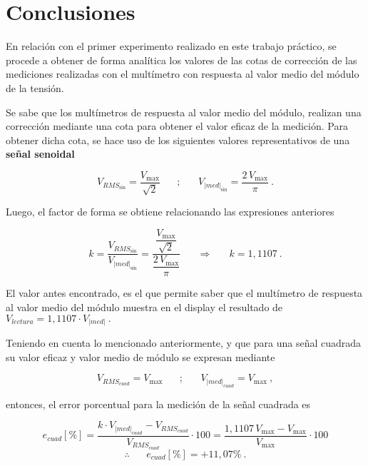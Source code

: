   \pagebreak
  \section{Conclusiones}
    En relación con el primer experimento realizado en este trabajo
    práctico, se procede a obtener de forma analítica los valores
    de las cotas de corrección de las mediciones realizadas con
    el multímetro con respuesta al valor medio del módulo de la 
    tensión.
    
    Se sabe que los multímetros de respuesta al valor medio del
    módulo, realizan una corrección mediante una cota para obtener 
    el valor eficaz de la medición. Para obtener dicha cota, se 
    hace uso de los siguientes valores representativos de una 
    \textbf{señal senoidal}

    \vspace{-5pt}
    $$ V_{RMS_{\sin}} = \dfrac{V_{\max}}{\sqrt{2}} \hspace{20pt} ; 
    \hspace{20pt} V_{|med|_{\sin}} = \dfrac{2\, V_{\max}}{\pi}~. $$

    \noindent Luego, el factor de forma se obtiene
    relacionando las expresiones anteriores
    
    \vspace{-5pt}
     $$ k = \dfrac{V_{RMS_{\sin}}}{V_{|med|_{\sin}}} 
        = \dfrac{\dfrac{V_{\max}}{\sqrt{2}}}{\dfrac{2\, V_{\max}}{\pi}}
        \hspace{20pt} \Longrightarrow \hspace{20pt} k = 1,1107~.$$

    El valor antes encontrado, es el que permite saber que el multímetro
    de respuesta al valor medio del módulo muestra en el display el 
    resultado de $ V_{lectura} = 1,1107 \cdot V_{|med|}~. $

    Teniendo en cuenta lo mencionado anteriormente, y que para una señal cuadrada
    su valor eficaz y valor medio de módulo se expresan mediante

    \vspace{-5pt}
    $$ V_{RMS_{cuad}} = V_{\max} \hspace{20pt} ; \hspace{20pt} V_{|med|_{cuad}} = V_{\max}~, $$

    \noindent entonces, el error porcentual para la medición de 
    la señal cuadrada es

    \vspace{-5pt}
    $$ e_{cuad} [\%] = \dfrac{k \cdot V_{|med|_{cuad}} -  V_{RMS_{cuad}}}{V_{RMS_{cuad}}} \cdot 100
              = \dfrac{1,1107\, V_{\max} - V_{\max}}{V_{\max}} \cdot 100 $$
              $$  \therefore \hspace{20pt} \boxed{e_{cuad}[\%] = +11,07\%}~.
    $$

